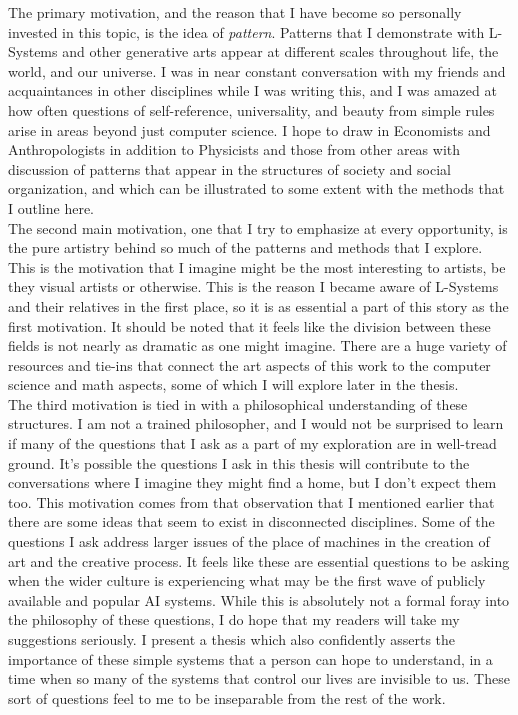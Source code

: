 \documentclass[12pt,twoside]{reedthesis}
\begin{document}
	The primary motivation, and the reason that I have become so personally invested in this topic, is the idea of \textit{pattern}. Patterns that I demonstrate with L-Systems and other generative arts appear at different scales throughout life, the world, and our universe. I was in near constant conversation with my friends and acquaintances in other disciplines while I was writing this, and I was amazed at how often questions of self-reference, universality, and beauty from simple rules arise in areas beyond just computer science. I hope to draw in Economists and Anthropologists in addition to Physicists and those from other areas with discussion of patterns that appear in the structures of society and social organization, and which can be illustrated to some extent with the methods that I outline here.\\

	The second main motivation, one that I try to emphasize at every opportunity, is the pure artistry behind so much of the patterns and methods that I explore. This is the motivation that I imagine might be the most interesting to artists, be they visual artists or otherwise. This is the reason I became aware of L-Systems and their relatives in the first place, so it is as essential a part of this story as the first motivation. It should be noted that it feels like the division between these fields is not nearly as dramatic as one might imagine. There are a huge variety of resources and tie-ins that connect the art aspects of this work to the computer science and math aspects, some of which I will explore later in the thesis. \\
	
	The third motivation is tied in with a philosophical understanding of these structures. I am not a trained philosopher, and I would not be surprised to learn if many of the questions that I ask as a part of my exploration are in well-tread ground. It’s possible the questions I ask in this thesis will contribute to the conversations where I imagine they might find a home, but I don't expect them too. This motivation comes from that observation that I mentioned earlier that there are some ideas that seem to exist in disconnected disciplines. Some of the questions I ask address larger issues of the place of machines in the creation of art and the creative process. It feels like these are essential questions to be asking when the wider culture is experiencing what may be the first wave of publicly available and popular AI systems. While this is absolutely not a formal foray into the philosophy of these questions, I do hope that my readers will take my suggestions seriously. I present a thesis which also confidently asserts the importance of these simple systems that a person can hope to understand, in a time when so many of the systems that control our lives are invisible to us. These sort of questions feel to me to be inseparable from the rest of the work.\\
	
\end{document}
